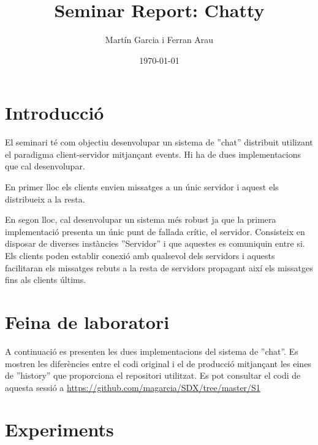 \documentclass[a4paper, 11pt]{article}
\title{Seminar Report: Chatty}
\author{Martín Garcia i Ferran Arau}
\date{\today{}}
\begin{document}
\maketitle

\section{Introducció}


El seminari té com objectiu desenvolupar un sistema de ''chat'' distribuit
utilizant el paradigma client-servidor mitjançant events. Hi ha de dues
implementacions que cal desenvolupar.

En primer lloc els clients envien missatges a un únic servidor i aquest els
distribueix a la resta. 

En segon lloc, cal desenvolupar un sistema més robust ja que la primera
implementació presenta un únic punt de fallada crític, el servidor. Consisteix
en disposar de diverses instàncies ''Servidor'' i que aquestes es comuniquin
entre si. Els clients poden establir conexió amb qualsevol dels servidors i
aquests facilitaran els missatges rebuts a la resta de servidors propagant així
els missatges fins als clients últims.

\section{Feina de laboratori}


A continuació es presenten les dues implementacions del sistema de ''chat''. Es
mostren les diferències entre el codi original i el de producció mitjançant les
eines de ''history'' que proporciona el repositori utilitzat. 
Es pot consultar el codi de aquesta sessió a
\url{https://github.com/magarcia/SDX/tree/master/S1}

\section{Experiments}

\end{document}
